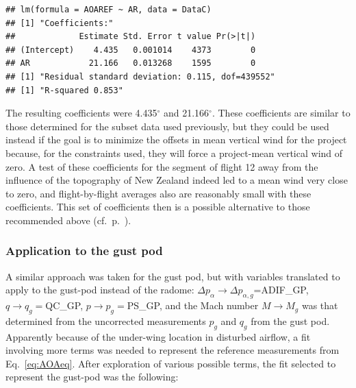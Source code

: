 \documentclass[12pt,twoside,english]{article}\usepackage[]{graphicx}\usepackage[]{color}
\makeatletter
\newenvironment{kframe}{%
 \def\at@end@of@kframe{}%
 \ifinner\ifhmode%
  \def\at@end@of@kframe{\end{minipage}}%
  \begin{minipage}{\columnwidth}%
 \fi\fi%
 \def\FrameCommand##1{\hskip\@totalleftmargin \hskip-\fboxsep
 \colorbox{shadecolor}{##1}\hskip-\fboxsep
     \hskip-\linewidth \hskip-\@totalleftmargin \hskip\columnwidth}%
 \MakeFramed {\advance\hsize-\width
   \@totalleftmargin\z@ \linewidth\hsize
   \@setminipage}}%
 {\par\unskip\endMakeFramed%
 \at@end@of@kframe}
\newenvironment{knitrout}{}{} %
\makeatother
\begin{document}
\begin{knitrout}\footnotesize
{}\color{fgcolor}\begin{kframe}
\begin{verbatim}
## lm(formula = AOAREF ~ AR, data = DataC)
## [1] "Coefficients:"
##             Estimate Std. Error t value Pr(>|t|)
## (Intercept)    4.435   0.001014    4373        0
## AR            21.166   0.013268    1595        0
## [1] "Residual standard deviation: 0.115, dof=439552"
## [1] "R-squared 0.853"
\end{verbatim}
\end{kframe}
\end{knitrout}

The resulting coefficients were 4.435$^{\circ}$ and 21.166$^{\circ}$.\label{coefficients-aoa-all-flt} These coefficients are similar to those determined for the subset data used previously, but they could be used instead if the goal is to minimize the offsets in mean vertical wind for the project because, for the constraints used, they will force a project-mean vertical wind of zero. A test of these coefficients for the segment of flight 12 away from the influence of the topography of New Zealand indeed led to a mean wind very close to zero, and flight-by-flight averages also are reasonably small with these coefficients. 
This set of coefficients then is a possible alternative to those recommended above (cf.~p.~\pageref{page:aoarec}).



\subsubsection{Application to the gust pod\label{sub:gust-pod-aoa}}

A similar approach was taken for the gust pod, but with variables translated to apply to the gust-pod instead of the radome: $\Delta p_{\alpha}\rightarrow\Delta p_{\alpha,g}$=ADIF\_GP, $q\rightarrow q_{g}=$QC\_GP, $p\rightarrow p_{g}=$PS\_GP, and the Mach number $M\rightarrow M_{g}$ was that determined from the uncorrected measurements $p_{g}$ and $q_{g}$ from the gust pod. Apparently because of the under-wing location in disturbed airflow, a fit involving more terms was needed to represent the reference measurements from Eq.~\ref{eq:AOAeq}. After exploration of various possible terms, the fit selected to represent the gust-pod was the following: 
\end{document}
